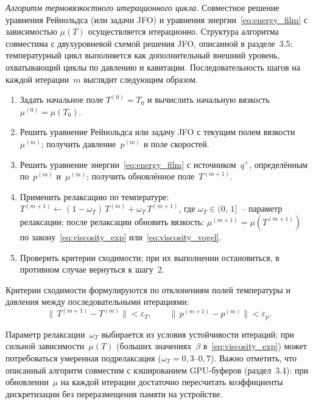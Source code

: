 \textit{Алгоритм термовязкостного итерационного цикла.}
Совместное решение уравнения Рейнольдса (или задачи JFO)
и уравнения энергии~\eqref{eq:energy_film} с зависимостью
$\mu(T)$ осуществляется итерационно. Структура алгоритма
совместима с двухуровневой схемой решения JFO, описанной
в разделе~3.5: температурный цикл выполняется как
дополнительный внешний уровень, охватывающий циклы
по давлению и кавитации. Последовательность шагов
на каждой итерации~$m$ выглядит следующим образом.
\begin{enumerate}[wide, labelindent=\parindent, nosep]
  \item Задать начальное поле
    $T^{(0)} = T_0$ и вычислить начальную вязкость
    $\mu^{(0)} = \mu(T_0)$.
  \item Решить уравнение Рейнольдса или задачу JFO
    с текущим полем вязкости~$\mu^{(m)}$; получить
    давление~$p^{(m)}$ и поле скоростей.
  \item Решить уравнение энергии~\eqref{eq:energy_film}
    с источником~$q^{+}$, определённым по~$p^{(m)}$
    и~$\mu^{(m)}$; получить обновлённое
    поле~$T^{(m+1)}$.
  \item Применить релаксацию по температуре:
    $T^{(m+1)} \leftarrow (1 - \omega_T)\,T^{(m)}
    + \omega_T\,T^{(m+1)}$,
    где $\omega_T \in (0,\,1]$~-- параметр релаксации;
    после релаксации обновить вязкость:
    $\mu^{(m+1)} = \mu(T^{(m+1)})$ по
    закону~\eqref{eq:viscosity_exp}
    или~\eqref{eq:viscosity_vogel}.
  \item Проверить критерии сходимости; при их выполнении
    остановиться, в противном случае вернуться к шагу~2.
\end{enumerate}

Критерии сходимости формулируются по отклонениям полей
температуры и давления между последовательными итерациями:
\begin{equation}
  \|\,T^{(m+1)} - T^{(m)}\| < \varepsilon_T, \qquad
  \|\,p^{(m+1)} - p^{(m)}\| < \varepsilon_p.
  \label{eq:thd_convergence}
\end{equation}

Параметр релаксации~$\omega_T$ выбирается из условия
устойчивости итераций; при сильной зависимости~$\mu(T)$
(больших значениях~$\beta$ в~\eqref{eq:viscosity_exp})
может потребоваться умеренная подрелаксация
($\omega_T = 0{,}3\text{--}0{,}7$). Важно отметить, что
описанный алгоритм совместим с кэшированием GPU-буферов
(раздел~3.4): при обновлении~$\mu$ на каждой итерации
достаточно пересчитать коэффициенты дискретизации без
переразмещения памяти на устройстве.

